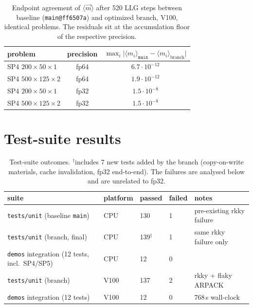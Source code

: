\documentclass[11pt,a4paper]{article}
\newcommand{\preexisting}{\textcolor{orange!80!black}{pre-existing}}
\begin{document}
\begin{table}[h]\centering\small
\begin{tabular}{lcc}
\toprule
problem & precision & $\max_i \lvert \langle m_i\rangle_\texttt{main} - \langle m_i\rangle_\text{branch} \rvert$ \\
\midrule
SP4 $200{\times}50{\times}1$ & fp64 & $6.7\cdot10^{-12}$ \\
SP4 $500{\times}125{\times}2$ & fp64 & $1.9\cdot10^{-12}$ \\
SP4 $200{\times}50{\times}1$ & fp32 & $1.5\cdot10^{-8}$ \\
SP4 $500{\times}125{\times}2$ & fp32 & $1.5\cdot10^{-8}$ \\
\bottomrule
\end{tabular}
\caption{Endpoint agreement of $\langle \vec m\rangle$ after 520 LLG steps between
baseline (\texttt{main@ff6507a}) and optimized branch, V100, identical problems.
The residuals sit at the accumulation floor of the respective precision.}
\label{tab:oldvsnew}
\end{table}

\section{Test-suite results}
\label{sec:suites}

\begin{table}[h]\centering\small
\begin{tabular}{lllll}
\toprule
suite & platform & passed & failed & notes \\
\midrule
\texttt{tests/unit} (baseline \texttt{main}) & CPU & 130 & 1 & \preexisting{} rkky failure \\
\texttt{tests/unit} (branch, final) & CPU & 139$^\dagger$ & 1 & same rkky failure only \\
\texttt{demos} integration (12 tests, incl.\ SP4/SP5) & CPU & 12 & 0 & \\
\texttt{tests/unit} (branch) & V100 & 137 & 2 & rkky + flaky ARPACK \\
\texttt{demos} integration (12 tests) & V100 & 12 & 0 & 768\,s wall-clock \\
\bottomrule
\end{tabular}
\caption{Test-suite outcomes. $^\dagger$includes 7 new tests added by the branch
(copy-on-write materials, cache invalidation, fp32 end-to-end).
The failures are analysed below and are unrelated to fp32.}
\end{table}
\end{document}
